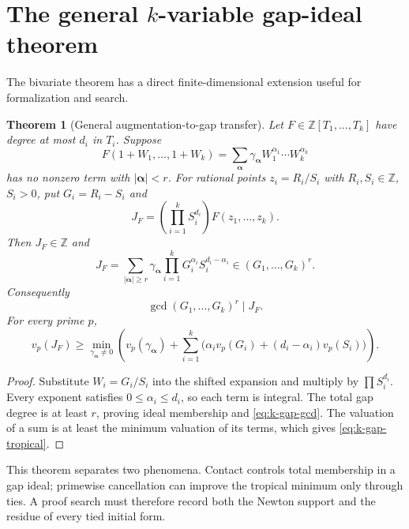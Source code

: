 \documentclass[11pt,oneside]{article}
\newtheorem{theorem}{Theorem}[section]
\theoremstyle{definition}
\theoremstyle{remark}
\newcommand{\Z}{\mathbb Z}
\begin{document}
\appendix

\section{The general \texorpdfstring{$k$}{k}-variable gap-ideal theorem}
\label{app:k-gap}

The bivariate theorem has a direct finite-dimensional extension useful for formalization and
search.

\begin{theorem}[General augmentation-to-gap transfer]
\label{thm:k-gap-transfer}
Let $F\in\Z[T_1,\ldots,T_k]$ have degree at most $d_i$ in $T_i$.  Suppose
\[
 F(1+W_1,\ldots,1+W_k)=
 \sum_{\boldsymbol\alpha}\gamma_{\boldsymbol\alpha}W_1^{\alpha_1}\cdots W_k^{\alpha_k}
\]
has no nonzero term with $|\boldsymbol\alpha|<r$.  For rational points
$z_i=R_i/S_i$ with $R_i,S_i\in\Z$, $S_i>0$, put $G_i=R_i-S_i$ and
\[
 J_F=\left(\prod_{i=1}^kS_i^{d_i}\right)F(z_1,\ldots,z_k).
\]
Then $J_F\in\Z$ and
\begin{equation}
 J_F=\sum_{|\boldsymbol\alpha|\ge r}
 \gamma_{\boldsymbol\alpha}
 \prod_{i=1}^kG_i^{\alpha_i}S_i^{d_i-\alpha_i}
 \in(G_1,\ldots,G_k)^r.
 \label{eq:k-gap-expansion}
\end{equation}
Consequently
\begin{equation}
 \gcd(G_1,\ldots,G_k)^r\mid J_F.
 \label{eq:k-gap-gcd}
\end{equation}
For every prime $p$,
\begin{equation}
 v_p(J_F)\ge
 \min_{\gamma_{\boldsymbol\alpha}\ne0}
 \left(v_p(\gamma_{\boldsymbol\alpha})+
 \sum_{i=1}^k\bigl(\alpha_iv_p(G_i)+(d_i-\alpha_i)v_p(S_i)\bigr)\right).
 \label{eq:k-gap-tropical}
\end{equation}
\end{theorem}

\begin{proof}
Substitute $W_i=G_i/S_i$ into the shifted expansion and multiply by
$\prod S_i^{d_i}$.  Every exponent satisfies $0\le\alpha_i\le d_i$, so each term is integral.
The total gap degree is at least $r$, proving ideal membership and
\eqref{eq:k-gap-gcd}.  The valuation of a sum is at least the minimum valuation of its terms,
which gives \eqref{eq:k-gap-tropical}.
\end{proof}

This theorem separates two phenomena.  Contact controls total membership in a gap ideal;
primewise cancellation can improve the tropical minimum only through ties.  A proof search
must therefore record both the Newton support and the residue of every tied initial form.
\end{document}
